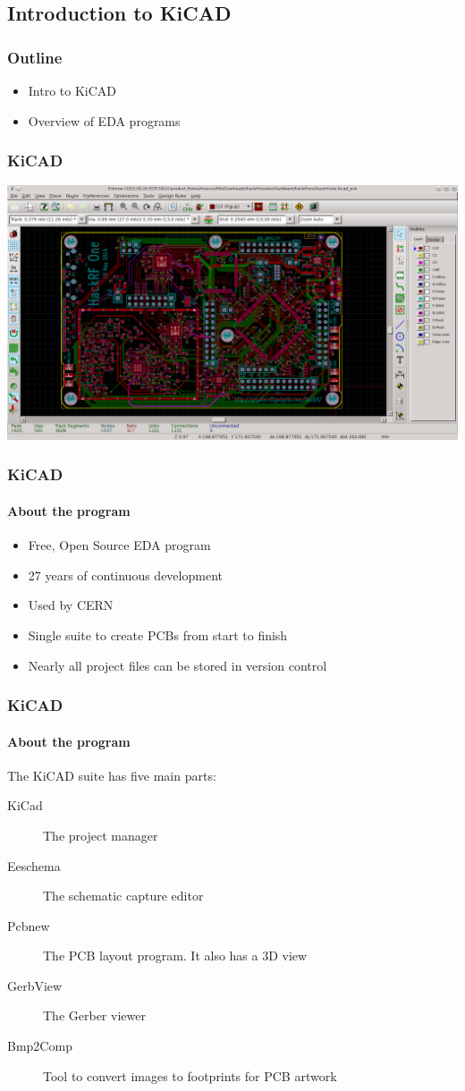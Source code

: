 \documentclass[]{beamer}
\begin{document}
\subsection[KiCAD]{Introduction to KiCAD}
\begin{frame}
    \frametitle{\insertsection{} Outline}
    \begin{itemize}
        \item Intro to KiCAD
        \item Overview of EDA programs
    \end{itemize}
\end{frame}

\begin{frame}
    \frametitle{KiCAD}
    \includegraphics[width=0.85\paperwidth,keepaspectratio]{images/KiCad_Pcbnew_OpenGL.png}
\end{frame}

\begin{frame}
    \frametitle{KiCAD}
    \framesubtitle{About the program}
    \begin{itemize}
        \item{Free, Open Source EDA program}
        \item{27 years of continuous development}
        \item{Used by CERN}
        \item{Single suite to create PCBs from start to finish}
        \item{Nearly all project files can be stored in version control}
    \end{itemize}
\end{frame}

\begin{frame}
    \frametitle{KiCAD}
    \framesubtitle{About the program}
    The KiCAD suite has five main parts:
    \begin{description}
        \item[KiCad]{The project manager}
        \item[Eeschema]{The schematic capture editor}
        \item[Pcbnew]{The PCB layout program. It also has a 3D view}
        \item[GerbView]{The Gerber viewer}
        \item[Bmp2Comp]{Tool to convert images to footprints for PCB artwork}
    \end{description}
\end{frame}
\end{document}
